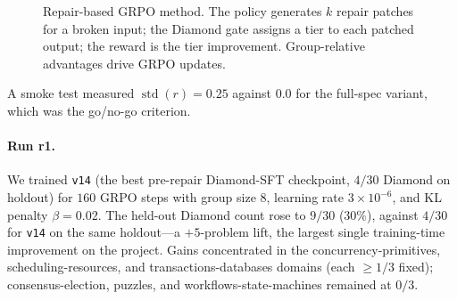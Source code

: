 \documentclass[11pt]{article}
\begin{document}
\begin{figure}[t]
\centering
{}
\caption{Repair-based GRPO method. The policy generates $k$ repair
patches for a broken input; the Diamond gate assigns a tier to each
patched output; the reward is the tier improvement. Group-relative
advantages drive GRPO updates.}
\label{fig:repair-method-flow}
\end{figure} A smoke test measured
$\operatorname{std}(r)=0.25$ against $0.0$ for the full-spec variant,
which was the go/no-go criterion.

\paragraph{Run r1.} We trained \texttt{v14} (the best pre-repair
Diamond-SFT checkpoint, $4/30$ Diamond on holdout) for $160$ GRPO
steps with group size $8$, learning rate $3\!\times\!10^{-6}$, and
KL penalty $\beta=0.02$. The held-out Diamond count rose to $9/30$
($30\%$), against $4/30$ for \texttt{v14} on the same holdout---a
$+5$-problem lift, the largest single training-time improvement on
the project. Gains concentrated in the concurrency-primitives,
scheduling-resources, and transactions-databases domains (each
$\ge 1/3$ fixed); consensus-election, puzzles, and
workflows-state-machines remained at $0/3$.
\end{document}
